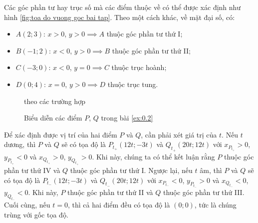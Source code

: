 \documentclass[a4paper, titlepage, openany]{book}
\begin{document}
Các góc phần tư hay trục số mà các điểm thuộc về có thể được xác định như hình \ref{fig:toa do vuong goc bai tap}. Theo một cách khác, về mặt đại số, có:
\begin{itemize}
   \item $A(2;3)$: $x>0$, $y>0 \implies A$ thuộc góc phần tư thứ I;
   \item $B(-1;2)$: $x<0$, $y>0 \implies B$ thuộc góc phần tư thứ II;
   \item $C(-3;0)$: $x<0$, $y=0 \implies C$ thuộc trục hoành;
   \item $D(0;4)$: $x=0$, $y>0 \implies D$ thuộc trục tung.
\end{itemize}

\begin{figure}[h]
   \centering
   \caption{Biểu diễn các điểm $P$, $Q$ trong bài \ref{ex:0.2}} theo các trường hợp
   \label{fig:toa do vuong goc PQ}
\end{figure}

Để xác định được vị trí của hai điểm $P$ và $Q$, cần phải xét giá trị của $t$. Nếu $t$ dương, thì $P$ và $Q$ sẽ có tọa độ là $P_{t_+}(12t;-3t)$ và $Q_{t_+}(20t;12t)$ với $x_{P_{t_+}}>0$, $y_{P_{t_+}}<0$ và $x_{Q_{t_+}}>0$, $y_{Q_{t_+}}>0$. Khi này, chúng ta có thể kết luận rằng $P$ thuộc góc phần tư thứ IV và $Q$ thuộc góc phần tư thứ I. Ngược lại, nếu $t$ âm, thì $P$ và $Q$ sẽ có tọa độ là $P_{t_-}(12t;-3t)$ và $Q_{t_-}(20t;12t)$ với $x_{P_{t_-}}<0$, $y_{P_{t_-}}>0$ và $x_{Q_{t_-}}<0$, $y_{Q_{t_-}}<0$. Khi này, $P$ thuộc góc phần tư thứ II và $Q$ thuộc góc phần tư thứ III. Cuối cùng, nếu $t=0$, thì cả hai điểm đều có tọa độ là $(0;0)$, tức là chúng trùng với gốc tọa độ.
\end{document}
